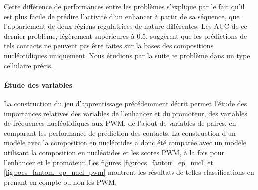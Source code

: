 \documentclass[french]{llncs}
\begin{document}
Cette différence de performances entre les problèmes s'explique par le fait qu'il est plus facile de prédire l'activité d'un enhancer à partir de sa séquence, que l'appariement de deux régions régulatrices de nature différentes. Les AUC de ce dernier problème, légèrement supérieures à 0.5, suggèrent que les prédictions de tels contacts ne peuvent pas être faites sur la bases des compositions nucléotidiques uniquement.
Nous étudions par la suite ce problème dans un type cellulaire précis.

\paragraph{Étude des variables} 


La construction du jeu d'apprentissage précédemment décrit permet l'étude des importances relatives des variables de l'enhancer et du promoteur, des variables de fréquences nucléotidiques aux PWM, de l'ajout de variables de paires, en comparant les performance de prédiction des contacts. 
La construction d'un modèle avec la composition en nucléotides a donc été comparée avec un modèle utilisant la composition en nucléotides et les scores PWM, à la fois pour l'enhancer et le promoteur. Les figures \ref{fig:rocs_fantom_ep_nucl} et \ref{fig:rocs_fantom_ep_nucl_pwm} montrent les résultats de telles classifications en prenant en compte ou non les PWM.
\end{document}
